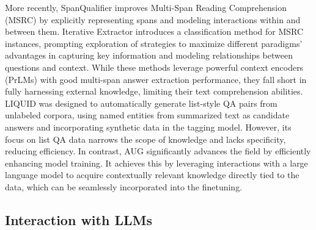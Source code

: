 More recently, SpanQualifier improves Multi-Span Reading Comprehension (MSRC) by explicitly representing spans and modeling interactions within and between them.
Iterative Extractor introduces a classification method for MSRC instances, prompting exploration of strategies to maximize different paradigms' advantages in capturing key information and modeling relationships between questions and context.
While these methods leverage powerful context encoders (PrLMs) with good multi-span answer extraction performance, they fall short in fully harnessing external knowledge, limiting their text comprehension abilities.
LIQUID was designed to automatically generate list-style QA pairs from unlabeled corpora, using named entities from summarized text as candidate answers and incorporating synthetic data in the tagging model. However, its focus on list QA data narrows the scope of knowledge and lacks specificity, reducing efficiency.
In contrast, AUG significantly advances the field by efficiently enhancing model training. It achieves this by leveraging interactions with a large language model to acquire contextually relevant knowledge directly tied to the data, which can be seamlessly incorporated into the finetuning.


\subsection{Interaction with LLMs}
